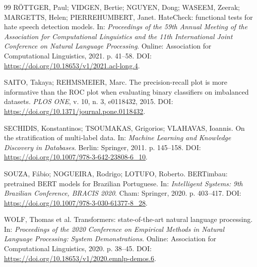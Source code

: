 \begin{thebibliography}{99}
RÖTTGER, Paul; VIDGEN, Bertie; NGUYEN, Dong; WASEEM, Zeerak; MARGETTS, Helen;
PIERREHUMBERT, Janet.
HateCheck: functional tests for hate speech detection models.
In: \textit{Proceedings of the 59th Annual Meeting of the Association for
Computational Linguistics and the 11th International Joint Conference on
Natural Language Processing}. Online: Association for Computational Linguistics,
2021. p. 41--58.
DOI: \url{https://doi.org/10.18653/v1/2021.acl-long.4}.

SAITO, Takaya; REHMSMEIER, Marc.
The precision-recall plot is more informative than the ROC plot when evaluating
binary classifiers on imbalanced datasets.
\textit{PLOS ONE}, v. 10, n. 3, e0118432, 2015.
DOI: \url{https://doi.org/10.1371/journal.pone.0118432}.

SECHIDIS, Konstantinos; TSOUMAKAS, Grigorios; VLAHAVAS, Ioannis.
On the stratification of multi-label data.
In: \textit{Machine Learning and Knowledge Discovery in Databases}.
Berlin: Springer, 2011. p. 145--158.
DOI: \url{https://doi.org/10.1007/978-3-642-23808-6_10}.

SOUZA, Fábio; NOGUEIRA, Rodrigo; LOTUFO, Roberto.
BERTimbau: pretrained BERT models for Brazilian Portuguese.
In: \textit{Intelligent Systems: 9th Brazilian Conference, BRACIS 2020}.
Cham: Springer, 2020. p. 403--417.
DOI: \url{https://doi.org/10.1007/978-3-030-61377-8_28}.

WOLF, Thomas et al.
Transformers: state-of-the-art natural language processing.
In: \textit{Proceedings of the 2020 Conference on Empirical Methods in Natural
Language Processing: System Demonstrations}. Online: Association for
Computational Linguistics, 2020. p. 38--45.
DOI: \url{https://doi.org/10.18653/v1/2020.emnlp-demos.6}.

\end{thebibliography}

